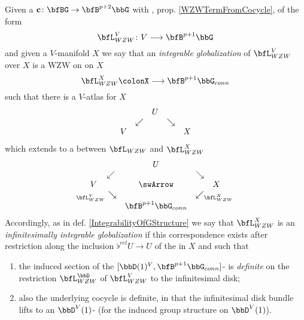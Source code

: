 \begin{defn}
\label{DefiniteGlobalizationofWZWTerm}\hypertarget{DefiniteGlobalizationofWZWTerm}{}
Given a  $\mathbf{c} \colon \bfBG\to\bfB^{p+2}\bbG$ with , prop. \ref{WZWTermFromCocycle}, of the form
\begin{displaymath}
\bfL_{WZW}^V
\colon
V \longrightarrow \bfB^{p+1}\bbG
\end{displaymath}
and given a $V$-manifold $X$ we say that an \emph{integrable globalization} of $\bfL_{WZW}^V$ over $X$ is a WZW on on $X$
\begin{displaymath}
\bfL_{WZW}^X \colonX \longrightarrow \bfB^{p+1}\bbG_{conn}
\end{displaymath}
such that there is a $V$-atlas for $X$
\begin{displaymath}
\begin{matrix}
&& U
\\
& \swarrow && \searrow
\\
V && && X
\end{matrix}
\end{displaymath}
which extends to a  between $\bfL_{WZW}$ and $\bfL_{WZW}^X$
\begin{displaymath}
\itexarray{
&& U
\\
& \swarrow && \searrow
\\
V && \swArrow && X
\\
& {}_{\mathllap{\bfL_{WZW}^V}}\searrow && \swarrow_{\mathrlap{\bfL_{WZW}^X}}
\\
&& \bfB^{p+1}\bbG_{conn}
}
\end{displaymath}
Accordingly, as in def. \ref{IntegrabilityOfGStructure} we say that $\bfL_{WZW}^X$ is an \emph{infinitesimally integrable globalization} if this correspondence exists after restriction along the inclusion $\flat^{rel} U \to U$ of the  in $X$ and such that
\begin{enumerate}%
\item the induced section of the  $[\bbD(1)^V,\bfB^{p+1}\bbG_{conn}]$- is \emph{definite} on the restriction $\bfL_{WZW}^{\bbD}$ of $\bfL_{WZW}^V$ to the infinitesimal disk;
\item also the underlying cocycle is definite, in that the infinitesimal disk bundle lifts to an $\bbD^V(1)$- (for the induced group structure on $\bbD^V(1)$).
\end{enumerate}
\end{defn}
